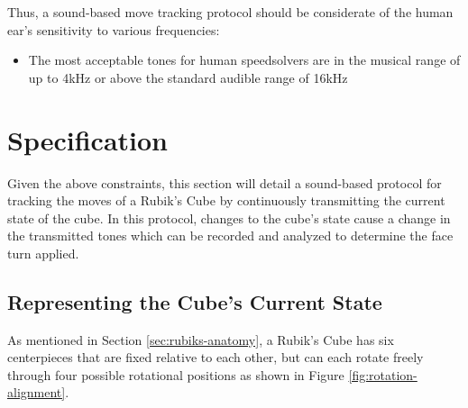 Thus, a sound-based move tracking protocol should be considerate of the human ear's sensitivity to various frequencies:
\begin{itemize}
    \item The most acceptable tones for human speedsolvers are in the musical range of up to 4kHz or above the standard audible range of 16kHz
\end{itemize}


\section{Specification}
\label{sec:specification}
Given the above constraints, this section will detail a sound-based protocol for tracking the moves of a Rubik's Cube by continuously transmitting the current state of the cube. In this protocol, changes to the cube's state cause a change in the transmitted tones which can be recorded and analyzed to determine the face turn applied.

\subsection{Representing the Cube's Current State}
\label{subsec:representing-cube-state}
As mentioned in Section \ref{sec:rubiks-anatomy}, a Rubik's Cube has six centerpieces that are fixed relative to each other, but can each rotate freely through four possible rotational positions as shown in Figure \ref{fig:rotation-alignment}.

